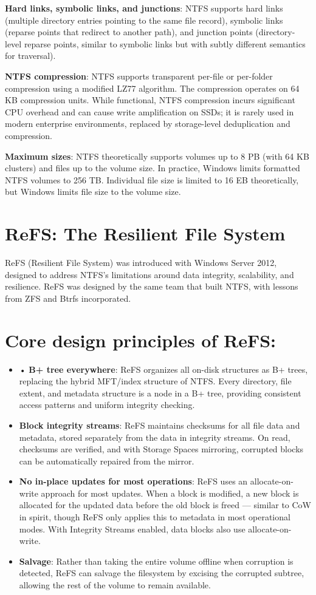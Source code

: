 \textbf{Hard links, symbolic links, and junctions}: NTFS supports hard links (multiple directory entries pointing to the same file record), symbolic links (reparse points that redirect to another path), and junction points (directory-level reparse points, similar to symbolic links but with subtly different semantics for traversal).

\textbf{NTFS compression}: NTFS supports transparent per-file or per-folder compression using a modified LZ77 algorithm. The compression operates on 64 KB compression units. While functional, NTFS compression incurs significant CPU overhead and can cause write amplification on SSDs; it is rarely used in modern enterprise environments, replaced by storage-level deduplication and compression.

\textbf{Maximum sizes}: NTFS theoretically supports volumes up to 8 PB (with 64 KB clusters) and files up to the volume size. In practice, Windows limits formatted NTFS volumes to 256 TB. Individual file size is limited to 16 EB theoretically, but Windows limits file size to the volume size.

\section{ReFS: The Resilient File System}
ReFS (Resilient File System) was introduced with Windows Server 2012, designed to address NTFS's limitations around data integrity, scalability, and resilience. ReFS was designed by the same team that built NTFS, with lessons from ZFS and Btrfs incorporated.

\section{Core design principles of ReFS:}
\begin{itemize}
  \item • \textbf{B+ tree everywhere}: ReFS organizes all on-disk structures as B+ trees, replacing the hybrid MFT/index structure of NTFS. Every directory, file extent, and metadata structure is a node in a B+ tree, providing consistent access patterns and uniform integrity checking.
  \item \textbf{Block integrity streams}: ReFS maintains checksums for all file data and metadata, stored separately from the data in integrity streams. On read, checksums are verified, and with Storage Spaces mirroring, corrupted blocks can be automatically repaired from the mirror.
  \item \textbf{No in-place updates for most operations}: ReFS uses an allocate-on-write approach for most updates. When a block is modified, a new block is allocated for the updated data before the old block is freed --- similar to CoW in spirit, though ReFS only applies this to metadata in most operational modes. With Integrity Streams enabled, data blocks also use allocate-on-write.
  \item \textbf{Salvage}: Rather than taking the entire volume offline when corruption is detected, ReFS can salvage the filesystem by excising the corrupted subtree, allowing the rest of the volume to remain available.
\end{itemize}

